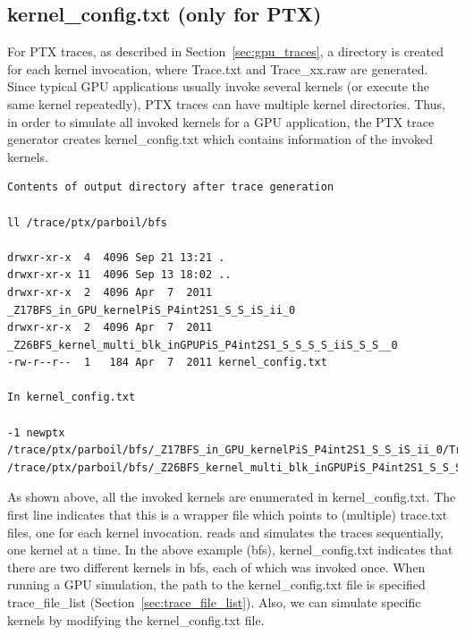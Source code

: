 \subsection{kernel\_config.txt (only for PTX)}
\label{sec:kern_config}

For PTX traces, as described in Section~\ref{sec:gpu_traces}, a directory is
created for each kernel invocation, where Trace.txt and Trace\_xx.raw are
generated. Since typical GPU applications usually invoke several kernels (or
    execute the same kernel repeatedly), PTX traces can have multiple kernel
directories. Thus, in order to simulate all invoked kernels for a GPU
application, the PTX trace generator creates kernel\_config.txt which contains
information of the invoked kernels.


\begin{Verbatim}
Contents of output directory after trace generation

ll /trace/ptx/parboil/bfs

drwxr-xr-x  4  4096 Sep 21 13:21 .
drwxr-xr-x 11  4096 Sep 13 18:02 ..
drwxr-xr-x  2  4096 Apr  7  2011 _Z17BFS_in_GPU_kernelPiS_P4int2S1_S_S_iS_ii_0
drwxr-xr-x  2  4096 Apr  7  2011 _Z26BFS_kernel_multi_blk_inGPUPiS_P4int2S1_S_S_S_S_iiS_S_S__0
-rw-r--r--  1   184 Apr  7  2011 kernel_config.txt

In kernel_config.txt

-1 newptx
/trace/ptx/parboil/bfs/_Z17BFS_in_GPU_kernelPiS_P4int2S1_S_S_iS_ii_0/Trace.txt
/trace/ptx/parboil/bfs/_Z26BFS_kernel_multi_blk_inGPUPiS_P4int2S1_S_S_S_S_iiS_S_S__0/Trace.txt
\end{Verbatim}


As shown above, all the invoked kernels are enumerated in kernel\_config.txt.
The first line indicates that this is a wrapper file which points to (multiple)
  trace.txt files, one for each kernel invocation. \SIM reads and simulates the
  traces sequentially, one kernel at a time.  In the above example (bfs),
  kernel\_config.txt indicates that there are two different kernels in bfs,
  each of which was invoked once. When running a GPU simulation, the path to
  the kernel\_config.txt file is specified trace\_file\_list
  (Section~\ref{sec:trace_file_list}).  Also, we can simulate specific kernels
  by modifying the kernel\_config.txt file.

